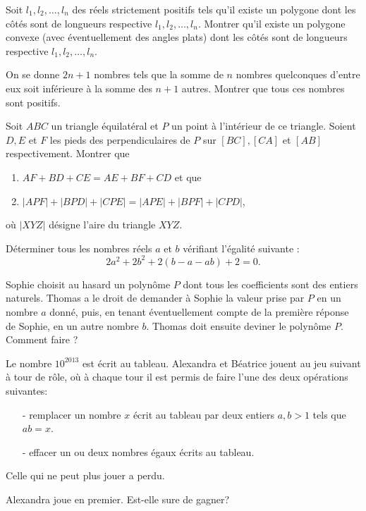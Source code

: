 
\begin{exo}{} Soit $l_1,l_2,\ldots,l_n$ des réels strictement positifs
tels qu'il existe un polygone dont les côtés sont de longueurs
respective $l_1,l_2,\ldots,l_n$. Montrer qu'il existe un polygone
convexe (avec éventuellement des angles plats) dont les côtés sont de
longueurs respective $l_1,l_2,\ldots,l_n$.
\end{exo}

\begin{exo}{}On se donne $2n+1$ nombres tels que la somme de $n$ nombres quelconques d'entre eux soit inférieure à la somme des $n+1$ autres. Montrer que tous ces nombres sont positifs.
\end{exo}

\begin{exo}{}Soit $ABC$ un triangle équilatéral et $P$ un point à l'intérieur de ce triangle. Soient $D,E$ et $F$ les pieds des perpendiculaires de $P$ sur $[BC],[CA]$ et $[AB]$ respectivement. Montrer que
\begin{enumerate}
	\item $AF+BD+CE=AE+BF+CD$ et que
	\item $|APF|+|BPD|+|CPE|=|APE|+|BPF|+|CPD|$,
\end{enumerate}
où $|XYZ|$ désigne l'aire du triangle $XYZ$.
\end{exo}

\begin{exo}{}Déterminer tous les nombres réels $a$ et $b$ vérifiant l'égalité suivante :
$$2a^{2}+2b^{2}+2(b-a-ab)+2=0.$$
\end{exo}

\begin{exo}{}Sophie choisit au hasard un polynôme $P$
dont tous les coefficients sont des entiers naturels. Thomas a le
droit de demander à Sophie la valeur prise par $P$ en un nombre $a$
donné, puis, en tenant éventuellement compte de la première réponse
de Sophie, en un autre nombre $b$. Thomas doit ensuite deviner le
polynôme $P$. Comment faire ? 
\end{exo}

\begin{exo}{}
Le nombre $10^{2013}$ est écrit au tableau. Alexandra et Béatrice jouent au jeu suivant à tour de rôle, où à chaque tour il est permis de faire l'une des deux opérations suivantes:
\begin{enumerate}
 \item[-] remplacer un nombre $x$ écrit au tableau par deux entiers $a,b>1$ tels que $ab=x$.
 \item[-] effacer un ou deux nombres égaux écrits au tableau.
  \end{enumerate}
Celle qui ne peut plus jouer a perdu. 

\smallskip

Alexandra joue en premier. Est-elle sure de gagner?
\end{exo}

